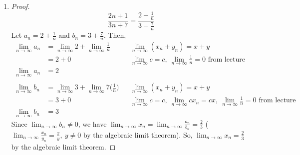 \documentclass[13pt]{article}
\begin{document}
\begin{enumerate}[label=(\alph*)]
\item
  \begin{proof}
    \[\frac{2n + 1}{3n + 7} = \frac{2 + \frac{1}{n}}{3 + \frac{7}{n}}\]
    Let $a_n = 2 + \frac{1}{n}$ and $b_n = 3 + \frac{7}{n}$. Then,
    \begin{align*}
      \lim_{n \rightarrow \infty} a_n &= \lim_{n \rightarrow \infty} 2 +
                                        \lim_{n \rightarrow \infty}
                                        \frac{1}{n} && \lim_{n
                                                       \rightarrow
                                                       \infty} (x_n +
                                                       y_n) = x + y \\
                                      &= 2 + 0 && \lim_{n \rightarrow \infty} c = c, \ \lim_{n
                                                  \rightarrow \infty} \frac{1}{n} = 0 \text{ from
                                                  lecture} \\
      \lim_{n \rightarrow \infty} a_n &= 2 \\ \\
      \lim_{n \rightarrow \infty} b_n &= \lim_{n \rightarrow \infty} 3
                                        + \lim_{n \rightarrow \infty}
                                        7\bigg(\frac{1}{n}\bigg) && \lim_{n
                                                       \rightarrow
                                                       \infty} (x_n +
                                                       y_n) = x + y \\
                                      &= 3 + 0 && \lim_{n \rightarrow
                                                  \infty} c = c, \
                                                  \lim_{n \rightarrow
                                                  \infty} cx_n = cx, \
                                                  \lim_{n \rightarrow
                                                  \infty} \frac{1}{n}
                                                  = 0 \text{ from
                                                  lecture} \\
      \lim_{n \rightarrow \infty} b_n &= 3
    \end{align*}
    Since $\lim_{n \rightarrow \infty} b_n \neq 0$, we have $\lim_{n
      \rightarrow \infty} x_n = \lim_{n \rightarrow \infty}
    \frac{a_n}{b_n} = \frac{2}{3}$ ($\lim_{n \rightarrow \infty}
    \frac{x_n}{y_n} = \frac{x}{y}, \ y \neq 0$ by the algebraic limit
    theorem). So, $\lim_{n \rightarrow \infty} x_n = \frac{2}{3}$ by
    the algebraic limit theorem.
  \end{proof}
\end{enumerate}
\end{document}
